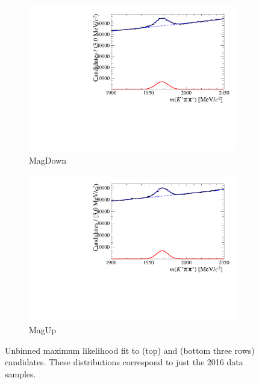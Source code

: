 \begin{figure}[!h]
\begin{subfigure}[t]{0.4\textwidth}
      \includegraphics[width=1.0\textwidth]{figs/Selection/Fit_Data_Bs02DsPi_Ds2KPiPi_2016_MagDown_PreSel.pdf}
      \caption{\decay{\Dsp}{\Kp\pim\pip} MagDown}
   \end{subfigure}
   \begin{subfigure}[t]{0.4\textwidth}
      \centering
      \includegraphics[width=1.0\textwidth]{figs/Selection/Fit_Data_Bs02DsPi_Ds2KPiPi_2016_MagUp_PreSel.pdf}
      \caption{\decay{\Dsp}{\Kp\pim\pip} MagUp}
   \end{subfigure}
   \caption{Unbinned maximum likelihood fit to \decay{\Bs}{\jpsi\phiz} (top) and \decay{\Bsb}{\Dsp\pim} (bottom three rows) candidates. These distributions correspond to just the 2016 data samples.}
   \label{fig:mvatrainingsamples}   
\end{figure}


